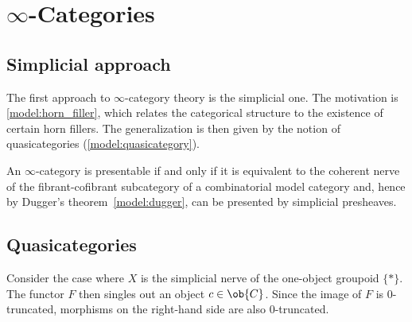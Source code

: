 
\section{\texorpdfstring{$\infty$-Categories}{Infinity-categories}}\label{section:infinity_categories}
\subsection{Simplicial approach}

    The first approach to $\infty$-category theory is the simplicial one. The motivation is \cref{model:horn_filler}, which relates the categorical structure to the existence of certain horn fillers. The generalization is then given by the notion of quasicategories (\cref{model:quasicategory}).

    \begin{theorem}[Lurie]\label{model:lurie_presentation}
        An $\infty$-category is presentable if and only if it is equivalent to  the coherent nerve of the fibrant-cofibrant subcategory of a combinatorial model category and, hence by Dugger's theorem~\ref{model:dugger}, can be presented by simplicial presheaves.
     \end{theorem}

\subsection{Quasicategories}

    \begin{remark}
        Consider the case where $X$ is the simplicial nerve of the one-object groupoid $\{\ast\}$. The functor $F$ then singles out an object $c\in\ob{C}$. Since the image of $F$ is 0-truncated, morphisms on the right-hand side are also 0-truncated.
        
    \end{remark}

